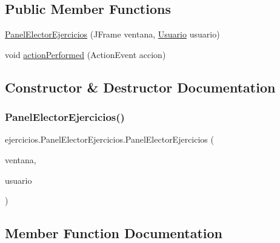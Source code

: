 \subsection*{Public Member Functions}
\begin{DoxyCompactItemize}
\item 
\mbox{\hyperlink{classejercicios_1_1_panel_elector_ejercicios_a2ba142be02622a39b427bc8430bf1ff3}{Panel\+Elector\+Ejercicios}} (J\+Frame ventana, \mbox{\hyperlink{classclases_1_1_usuario}{Usuario}} usuario)
\item 
void \mbox{\hyperlink{classejercicios_1_1_panel_elector_ejercicios_a8275ea5d2da4b6107b5125dd09420967}{action\+Performed}} (Action\+Event accion)
\end{DoxyCompactItemize}


\subsection{Constructor \& Destructor Documentation}
\mbox{\label{classejercicios_1_1_panel_elector_ejercicios_a2ba142be02622a39b427bc8430bf1ff3}} 
\subsubsection{\texorpdfstring{Panel\+Elector\+Ejercicios()}{PanelElectorEjercicios()}}
{\footnotesize\ttfamily ejercicios.\+Panel\+Elector\+Ejercicios.\+Panel\+Elector\+Ejercicios (\begin{DoxyParamCaption}\item[{J\+Frame}]{ventana,  }\item[{\mbox{\hyperlink{classclases_1_1_usuario}{Usuario}}}]{usuario }\end{DoxyParamCaption})}



\subsection{Member Function Documentation}
\mbox{\label{classejercicios_1_1_panel_elector_ejercicios_a8275ea5d2da4b6107b5125dd09420967}} 
